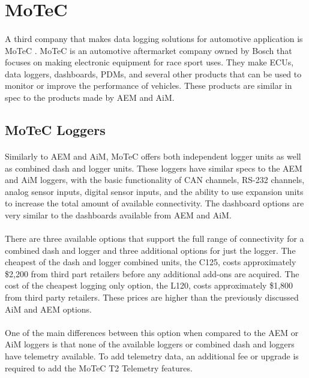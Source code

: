 \section{MoTeC}

\paragraph{}
A third company that makes data logging solutions for automotive application is MoTeC \cite{MoTeCSite}.
MoTeC is an automotive aftermarket company owned by Bosch that focuses on making electronic equipment for race sport uses.
They make ECUs, data loggers, dashboards, PDMs, and several other products that can be used to monitor or improve the performance of vehicles.
These products are similar in spec to the products made by AEM and AiM.

\subsection{MoTeC Loggers}

\paragraph{}
Similarly to AEM and AiM, MoTeC offers both independent logger units as well as combined dash and logger units.
These loggers have similar specs to the AEM and AiM loggers, with the basic functionality of CAN channels, RS-232 channels, analog sensor inputs, digital sensor inputs, and the ability to use expansion units to increase the total amount of available connectivity.
The dashboard options are very similar to the dashboards available from AEM and AiM.

\paragraph{}
There are three available options that support the full range of connectivity for a combined dash and logger and three additional options for just the logger.
The cheapest of the dash and logger combined units, the C125, costs approximately \$2,200 from third part retailers before any additional add-ons are acquired.
The cost of the cheapest logging only option, the L120, costs approximately \$1,800 from third party retailers.
These prices are higher than the previously discussed AiM and AEM options.

\paragraph{}
One of the main differences between this option when compared to the AEM or AiM loggers is that none of the available loggers or combined dash and loggers have telemetry available.
To add telemetry data, an additional fee or upgrade is required to add the MoTeC T2 Telemetry features.

